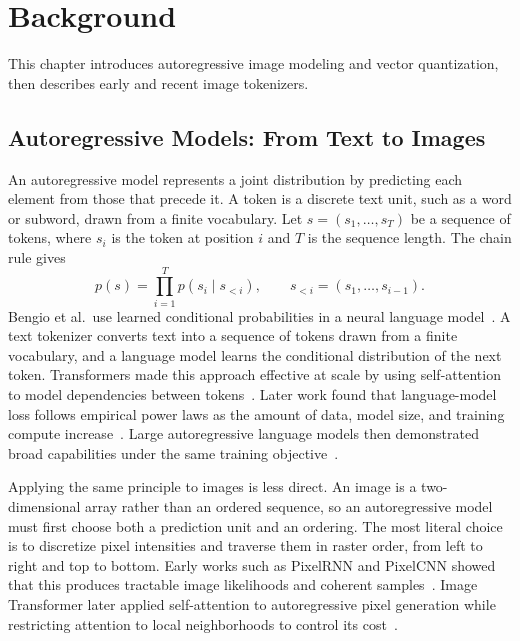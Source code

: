\chapter{Background}
\label{ch:background}


This chapter introduces autoregressive image modeling and vector quantization,
then describes early and recent image tokenizers.

\section{Autoregressive Models: From Text to Images}
\label{sec:ar_models_text_to_images}

An autoregressive model represents a joint distribution by predicting each
element from those that precede it. A token is a discrete text unit, such as a
word or subword, drawn from a finite vocabulary. Let
$s=(s_1,\ldots,s_T)$ be a sequence of tokens, where $s_i$ is the token at
position $i$ and $T$ is the sequence length. The chain rule gives
\begin{equation}
    p(s)=\prod_{i=1}^{T}p(s_i\mid s_{<i}),
    \qquad s_{<i}=(s_1,\ldots,s_{i-1}).
\end{equation}
Bengio et al.\ use learned conditional probabilities in a neural language
model~\cite{bengio2003neural}. A text tokenizer converts text into a sequence
of tokens drawn from a finite vocabulary, and a language model learns the
conditional distribution of the next token. Transformers made this approach
effective at scale by using self-attention to model dependencies between
tokens~\cite{vaswani2017attention}. Later work found that language-model loss
follows empirical power laws as the amount of data, model size, and training
compute increase~\cite{kaplan2020scaling}. Large autoregressive language models
then demonstrated broad capabilities under the same training
objective~\cite{brown2020language,touvron2023llama}.

Applying the same principle to images is less direct. An image is a
two-dimensional array rather than an ordered sequence, so an autoregressive
model must first choose both a prediction unit and an ordering. The most literal
choice is to discretize pixel intensities and traverse them in raster order,
from left to right and top to bottom. Early works such as PixelRNN and PixelCNN
showed that this produces tractable image likelihoods and coherent
samples~\cite{oord2016pixel}. Image Transformer later applied self-attention to
autoregressive pixel generation while restricting attention to local
neighborhoods to control its cost~\cite{parmar2018image}.

